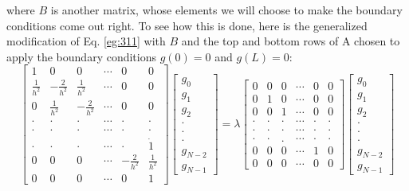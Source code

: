 \documentclass{book}
\theoremstyle{plain}
\theoremstyle{definition}
\numberwithin{exm}{chapter}
\theoremstyle{remark}
\theoremstyle{summary}
\theoremstyle{overview}
\begin{document}
where $B$ is another matrix, whose elements we will choose to make the boundary
conditions come out right. To see how this is done, here is the generalized modification of Eq. \eqref{eg:311} with $B$ and the top and bottom rows of A chosen to apply the boundary conditions
$g (0) = 0$ and $g(L)= 0$:
\begin{equation}
\left[\begin{array}{cccccc}
1 & 0 & 0 & \cdots & 0 & 0 \\
\frac{1}{h^{2}} & -\frac{2}{h^{2}} & \frac{1}{h^{2}} & \cdots & 0 & 0 \\
0 & \frac{1}{h^{2}} & -\frac{2}{h^{2}} & \cdots & 0 & 0 \\
\cdot & \cdot & \cdot & \cdots & \cdot & \cdot \\
\cdot & \cdot & \cdot & \cdots & \cdot & \cdot \\
\cdot & \cdot & \cdot & \cdots & \cdot & \dot{1} \\
0 & 0 & 0 & \cdots & -\frac{2}{h^{2}} & \frac{1}{h^{2}} \\
0 & 0 & 0 & \cdots & 0 & 1
\end{array}\right]\left[\begin{array}{c}
g_{0} \\
g_{1} \\
g_{2} \\
\cdot \\
\cdot \\
\cdot \\
g_{N-2} \\
g_{N-1}
\end{array}\right] = \lambda
\left[\begin{array}{cccccc}
0 & 0 & 0 & \cdots & 0 & 0 \\
0 & 1 & 0 & \cdots & 0 & 0 \\
0 & 0 & 1 & \cdots & 0 & 0 \\
\cdot & \cdot & \cdot & \cdots & \cdot & \cdot \\
\cdot & \cdot & \cdot & \cdots & \cdot & \cdot \\
\cdot & \cdot & . & \cdots & \cdot & \cdot \\
0 & 0 & 0 & \cdots & 1 & 0 \\
0 & 0 & 0 & \cdots & 0 & 0
\end{array}\right]\left[\begin{array}{r}
g_{0} \\
g_{1} \\
g_{2} \\
\cdot \\
\cdot \\
\cdot \\
g_{N-2} \\
g_{N-1}
\end{array}\right]
\end{equation}
\end{document}

